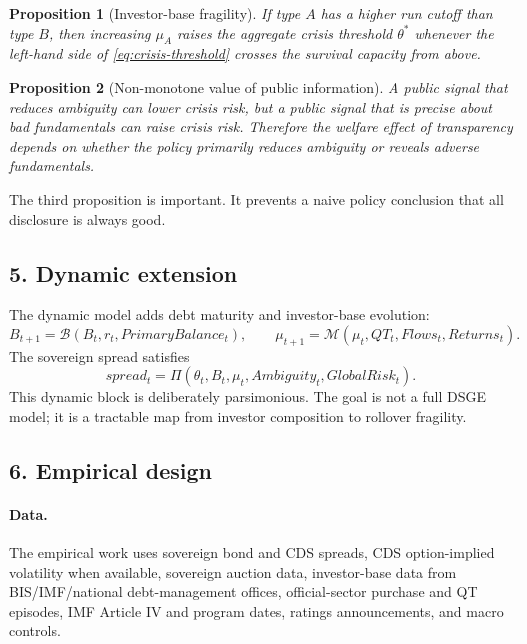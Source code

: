 \documentclass[11pt]{article}
\newtheorem{proposition}{Proposition}
\begin{document}
\begin{proposition}[Investor-base fragility]
If type $A$ has a higher run cutoff than type $B$, then increasing $\mu_A$ raises the aggregate crisis threshold $\theta^*$ whenever the left-hand side of \eqref{eq:crisis-threshold} crosses the survival capacity from above.
\end{proposition}

\begin{proposition}[Non-monotone value of public information]
A public signal that reduces ambiguity can lower crisis risk, but a public signal that is precise about bad fundamentals can raise crisis risk. Therefore the welfare effect of transparency depends on whether the policy primarily reduces ambiguity or reveals adverse fundamentals.
\end{proposition}

The third proposition is important. It prevents a naive policy conclusion that all disclosure is always good.

\subsection*{5. Dynamic extension}
The dynamic model adds debt maturity and investor-base evolution:
\begin{equation}
B_{t+1}=\mathcal B(B_t,r_t,PrimaryBalance_t), \qquad \mu_{t+1}=\mathcal M(\mu_t,QT_t,Flows_t,Returns_t). \label{eq:dynamic-investor-base}
\end{equation}
The sovereign spread satisfies
\begin{equation}
spread_t=\Pi(\theta_t,B_t,\mu_t,Ambiguity_t,GlobalRisk_t). \label{eq:spread-ambiguity}
\end{equation}
This dynamic block is deliberately parsimonious. The goal is not a full DSGE model; it is a tractable map from investor composition to rollover fragility.

\subsection*{6. Empirical design}
\paragraph{Data.} The empirical work uses sovereign bond and CDS spreads, CDS option-implied volatility when available, sovereign auction data, investor-base data from BIS/IMF/national debt-management offices, official-sector purchase and QT episodes, IMF Article IV and program dates, ratings announcements, and macro controls.
\end{document}
